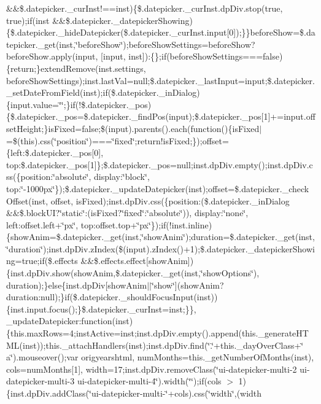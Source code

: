 {{\begin{DoxyParamCaption}
\&\&\$.\+datepicker.\+\_\+cur\+Inst!==inst)\{\$.\+datepicker.\+\_\+cur\+Inst.\+dp\+Div.\+stop(true, true);if(inst \&\&\$.\+datepicker.\+\_\+datepicker\+Showing)\{\$.\+datepicker.\+\_\+hide\+Datepicker(\$.\+datepicker.\+\_\+cur\+Inst.\+input\mbox{[}0\mbox{]});\}\}before\+Show=\$.\+datepicker.\+\_\+get(inst,\char`\"{}before\+Show\char`\"{});before\+Show\+Settings=before\+Show?before\+Show.\+apply(input, \mbox{[}input, inst\mbox{]})\+:\{\};if(before\+Show\+Settings===false)\{return;\}extend\+Remove(inst.\+settings, before\+Show\+Settings);inst.\+last\+Val=null;\$.\+datepicker.\+\_\+last\+Input=input;\$.\+datepicker.\+\_\+set\+Date\+From\+Field(inst);if(\$.\+datepicker.\+\_\+in\+Dialog)\{input.\+value=\char`\"{}\char`\"{};\}if(!\$.\+datepicker.\+\_\+pos)\{\$.\+datepicker.\+\_\+pos=\$.\+datepicker.\+\_\+find\+Pos(input);\$.\+datepicker.\+\_\+pos\mbox{[}1\mbox{]}+=input.\+offset\+Height;\}is\+Fixed=false;\$(input).\+parents().\+each(function()\{is\+Fixed$\vert$=\$(this).\+css(\char`\"{}position\char`\"{})===\char`\"{}fixed\char`\"{};return!is\+Fixed;\});offset=\{left\+:\$.\+datepicker.\+\_\+pos\mbox{[}0\mbox{]}, top\+:\$.\+datepicker.\+\_\+pos\mbox{[}1\mbox{]}\};\$.\+datepicker.\+\_\+pos=null;inst.\+dp\+Div.\+empty();inst.\+dp\+Div.\+css(\{position\+:\char`\"{}absolute\char`\"{}, display\+:\char`\"{}block\char`\"{}, top\+:\char`\"{}-\/1000px\char`\"{}\});\$.\+datepicker.\+\_\+update\+Datepicker(inst);offset=\$.\+datepicker.\+\_\+check\+Offset(inst, offset, is\+Fixed);inst.\+dp\+Div.\+css(\{position\+:(\$.\+datepicker.\+\_\+in\+Dialog \&\&\$.\+block\+U\+I?\char`\"{}static\char`\"{}\+:(is\+Fixed?\char`\"{}fixed\char`\"{}\+:\char`\"{}absolute\char`\"{})), display\+:\char`\"{}none\char`\"{}, left\+:offset.\+left+\char`\"{}px\char`\"{}, top\+:offset.\+top+\char`\"{}px\char`\"{}\});if(!inst.\+inline)\{show\+Anim=\$.\+datepicker.\+\_\+get(inst,\char`\"{}show\+Anim\char`\"{});duration=\$.\+datepicker.\+\_\+get(inst,\char`\"{}duration\char`\"{});inst.\+dp\+Div.\+z\+Index(\$(input).\+z\+Index()+1);\$.\+datepicker.\+\_\+datepicker\+Showing=true;if(\$.\+effects \&\&\$.\+effects.\+effect\mbox{[}show\+Anim\mbox{]})\{inst.\+dp\+Div.\+show(show\+Anim,\$.\+datepicker.\+\_\+get(inst,\char`\"{}show\+Options\char`\"{}), duration);\}else\{inst.\+dp\+Div\mbox{[}show\+Anim$\vert$$\vert$\char`\"{}show\char`\"{}\mbox{]}(show\+Anim?duration\+:null);\}if(\$.\+datepicker.\+\_\+should\+Focus\+Input(inst))\{inst.\+input.\+focus();\}\$.\+datepicker.\+\_\+cur\+Inst=inst;\}\}, \+\_\+update\+Datepicker\+:function(inst)\{this.\+max\+Rows=4;inst\+Active=inst;inst.\+dp\+Div.\+empty().\+append(this.\+\_\+generate\+H\+T\+M\+L(inst));this.\+\_\+attach\+Handlers(inst);inst.\+dp\+Div.\+find(\char`\"{}.\char`\"{}+this.\+\_\+day\+Over\+Class+\char`\"{} a\char`\"{}).\+mouseover();var origyearshtml, num\+Months=this.\+\_\+get\+Number\+Of\+Months(inst), cols=num\+Months\mbox{[}1\mbox{]}, width=17;inst.\+dp\+Div.\+remove\+Class(\char`\"{}ui-\/datepicker-\/multi-\/2 ui-\/datepicker-\/multi-\/3 ui-\/datepicker-\/multi-\/4\char`\"{}).\+width(\char`\"{}\char`\"{});if(cols $>$ 1)\{inst.\+dp\+Div.\+add\+Class(\char`\"{}ui-\/datepicker-\/multi-\/\char`\"{}+cols).\+css(\char`\"{}width\char`\"{},(width 
\end{DoxyParamCaption}}}
